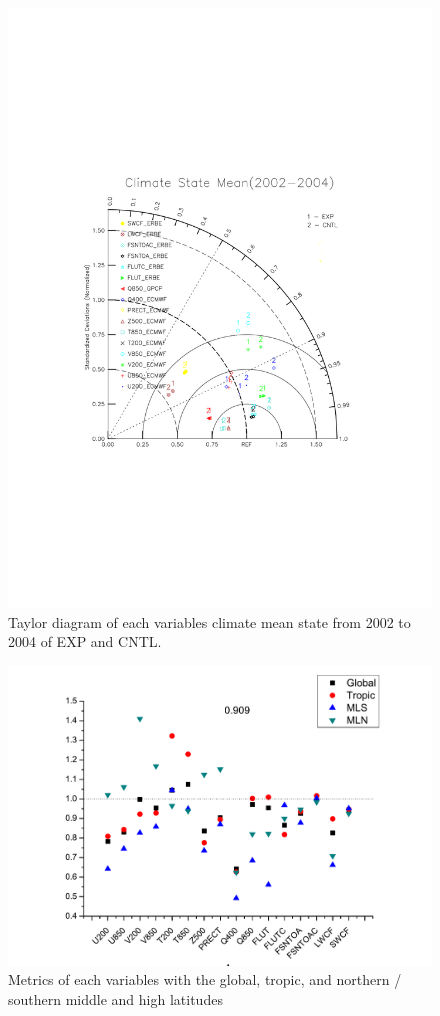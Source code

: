 \documentclass[gmd, manuscript]{copernicus}
\begin{document}
\begin{figure}[t]
\includegraphics[width=12cm]{taylor}
\caption{Taylor diagram of each variables climate mean state from 2002 to 2004 of EXP and CNTL.}
\end{figure}

\begin{figure}[t]
\includegraphics[width=15.3cm]{reg}
\caption{Metrics of each variables with the global, tropic, and northern / southern middle and high latitudes}
\end{figure}
\end{document}
